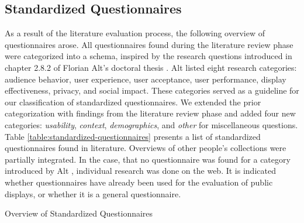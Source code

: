 \subsection{Standardized Questionnaires}
\label{section:questionnaires:categorization}


	As a result of the literature evaluation process, the following overview of questionnaires arose. All questionnaires found during the literature review phase were categorized into a schema, inspired by the research questions introduced in chapter 2.8.2 of Florian Alt's doctoral thesis \cite{alt2013thesis}. Alt listed eight research categories: audience behavior, user experience, user acceptance, user performance, display effectiveness, privacy, and social impact. These categories served as a guideline for our classification of standardized questionnaires. We extended the prior categorization with findings from the literature review phase and added four new categories: \textit{usability}, \textit{context}, \textit{demographics}, and \textit{other} for miscellaneous questions.	Table \ref{table:standardized-questionnaires} presents a list of standardized questionnaires found in literature. Overviews of other people's collections \cite{Lewis2013HCI, Garcia2013UXResearch, Geneve2014Wiki, Chur2014Questionnaires, wechsung2008evaluation} were partially integrated. In the case, that no questionnaire was found for a category introduced by Alt \cite{alt2013thesis}, individual research was done on the web. It is indicated whether questionnaires have already been used for the evaluation of public displays, or whether it is a general questionnaire.



		\begin{table}[p]
			\small
			\center
			\begin{adjustwidth}{-2cm}{}
			    
			    \caption[Standardized Questionnaires]{Overview of Standardized Questionnaires}
			\label{table:standardized-questionnaires}
			            \end{adjustwidth}

		\end{table}


